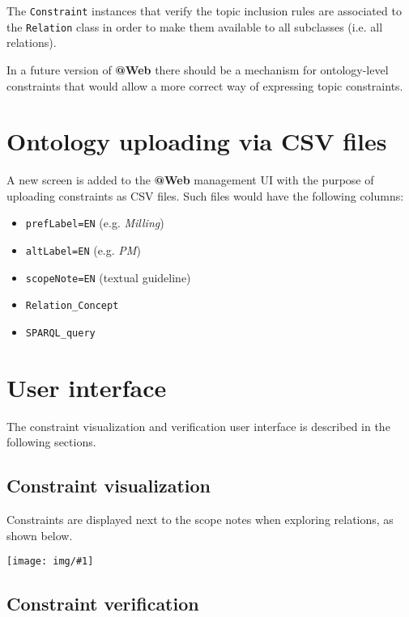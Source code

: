 \documentclass[a4paper, 10pt]{article}
\makeatletter
\newcommand{\atweb}{\textbf{@Web}\xspace}
\newcommand{\code}[1]{\texttt{#1}}
\newcommand{\img}[2]{
  \begin{center}
    \texttt{[image: img/\#1]}
  \end{center}
}
\makeatother
\begin{document}
The \code{Constraint} instances that verify the topic inclusion rules are
associated to the \code{Relation} class in order to make them available to all
subclasses (i.e. all relations).

In a future version of \atweb there should be a mechanism for ontology-level
constraints that would allow a more correct way of expressing topic
constraints.


\section{Ontology uploading via CSV files}

A new screen is added to the \atweb management UI with the purpose of uploading
constraints as CSV files. Such files would have the following columns:

\begin{itemize}
  \item \code{prefLabel=EN} (e.g. \textit{Milling})
  \item \code{altLabel=EN} (e.g. \textit{PM})
  \item \code{scopeNote=EN} (textual guideline)
  \item \code{Relation\_Concept}
  \item \code{SPARQL\_query}
\end{itemize}


\section{User interface}

The constraint visualization and verification user interface is described in
the following sections.

\subsection{Constraint visualization}

Constraints are displayed next to the scope notes when exploring relations, as
shown below.

\img{constraint-visualization.png}{12cm}

\subsection{Constraint verification}
\end{document}
